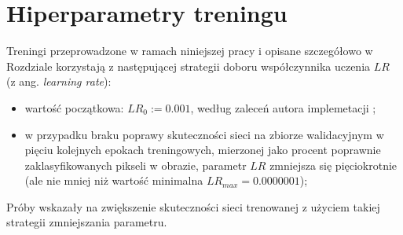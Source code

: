 \section{Hiperparametry treningu}

Treningi przeprowadzone w ramach niniejszej pracy i opisane szczegółowo w Rozdziale  korzystają z następującej strategii doboru współczynnika uczenia $LR$ (z ang. \textit{learning rate}):
\begin{itemize}
  \item wartość początkowa: $LR_{0} := 0.001$, według zaleceń autora implemetacji \cite{matterport-mask-rcnn};
  \item w przypadku braku poprawy skuteczności sieci na zbiorze walidacyjnym w pięciu kolejnych epokach treningowych, mierzonej jako procent poprawnie zaklasyfikowanych pikseli w obrazie, parametr $LR$ zmniejsza się pięciokrotnie (ale nie mniej niż wartość minimalna $ LR_{max} = 0.0000001 $);
\end{itemize}

Próby wskazały na zwiększenie skuteczności sieci trenowanej z użyciem takiej strategii zmniejszania parametru.
